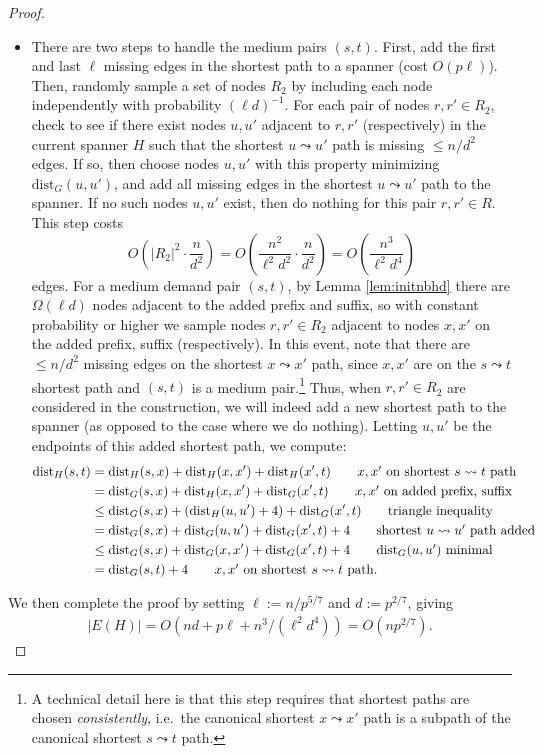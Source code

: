 \documentclass{article}
\newcommand{\dist}{\text{dist}}
\begin{document}
\begin{proof}
\begin{itemize}
\item There are two steps to handle the medium pairs $(s, t)$.
First, add the first and last $\ell$ missing edges in the shortest path to a spanner (cost $O(p \ell)$).
Then, randomly sample a set of nodes $R_2$ by including each node independently with probability $(\ell d)^{-1}$.
For each pair of nodes $r, r' \in R_2$, check to see if there exist nodes $u, u'$ adjacent to $r, r'$ (respectively) in the current spanner $H$ such that the shortest $u \leadsto u'$ path is missing $\le n/d^2$ edges.
If so, then choose nodes $u, u'$ with this property minimizing $\dist_G(u, u')$, and add all missing edges in the shortest $u \leadsto u'$ path to the spanner.
If no such nodes $u, u'$ exist, then do nothing for this pair $r, r' \in R$.
This step costs
$$O\left( |R_2|^2 \cdot \frac{n}{d^2} \right) = O\left( \frac{n^2}{\ell^2 d^2} \cdot \frac{n}{d^2} \right) = O\left( \frac{n^3}{\ell^2 d^4} \right)$$
edges.
For a medium demand pair $(s, t)$, by Lemma \ref{lem:initnbhd} there are $\Omega(\ell d)$ nodes adjacent to the added prefix and suffix, so with constant probability or higher we sample nodes $r, r' \in R_2$ adjacent to nodes $x, x'$ on the added prefix, suffix (respectively).
In this event, note that there are $\le n/d^2$ missing edges on the shortest $x \leadsto x'$ path, since $x, x'$ are on the $s \leadsto t$ shortest path and $(s, t)$ is a medium pair.\footnote{A technical detail here is that this step requires that shortest paths are chosen \emph{consistently}, i.e.\ the canonical shortest $x \leadsto x'$ path is a subpath of the canonical shortest $s \leadsto t$ path.}
Thus, when $r, r' \in R_2$ are considered in the construction, we will indeed add a new shortest path to the spanner (as opposed to the case where we do nothing).
Letting $u, u'$ be the endpoints of this added shortest path, we compute:
\begin{align*}
\dist_H(s, t) &= \dist_H(s, x) + \dist_H(x, x') + \dist_H(x', t) \tag*{$x, x'$ on shortest $s \leadsto t$ path}\\
&= \dist_G(s, x) + \dist_H(x, x') + \dist_G(x', t) \tag*{$x, x'$ on added prefix, suffix}\\
&\le \dist_G(s, x) + \left(\dist_H(u, u') + 4\right) + \dist_G(x', t) \tag*{triangle inequality}\\
&= \dist_G(s, x) + \dist_G(u, u') + \dist_G(x', t) + 4 \tag*{shortest $u \leadsto u'$ path added}\\
&\le \dist_G(s, x) + \dist_G(x, x') + \dist_G(x', t) + 4 \tag*{$\dist_G(u, u')$ minimal}\\
&= \dist_G(s, t) + 4 \tag*{$x, x'$ on shortest $s \leadsto t$ path.}
\end{align*}
\end{itemize}
We then complete the proof by setting $\ell := n/p^{5/7}$ and $d := p^{2/7}$, giving
\begin{align*}
|E(H)| = O\left(nd + p\ell + n^3/(\ell^2 d^4) \right) = O\left(np^{2/7}\right). \tag*{\qedhere}
\end{align*}
\end{proof}
\end{document}
